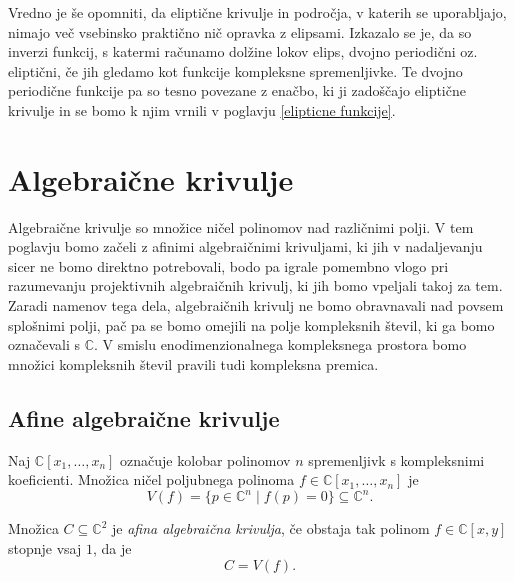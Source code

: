 \documentclass[mat1]{fmfdelo}
\numberwithin{equation}{section}
\newcommand{\C}{\mathbb C}
\theoremstyle{definition}
\begin{document}
Vredno je še opomniti, da eliptične krivulje in področja, v katerih se uporabljajo,
nimajo več vsebinsko praktično nič opravka z elipsami. 
Izkazalo se je, da so inverzi funkcij, s katermi računamo dolžine lokov elips, dvojno periodični oz. eliptični,
če jih gledamo kot funkcije kompleksne spremenljivke. Te dvojno periodične funkcije pa so tesno povezane z enačbo,
ki ji zadoščajo eliptične krivulje in se bomo k njim vrnili v poglavju \ref{elipticne funkcije}.


\section{Algebraične krivulje} \label{algebraicne krivulje}
Algebraične krivulje so množice ničel polinomov nad različnimi polji. V tem poglavju bomo začeli 
z afinimi
algebraičnimi krivuljami, ki jih v nadaljevanju sicer ne bomo direktno potrebovali, bodo pa igrale pomembno
vlogo pri razumevanju projektivnih algebraičnih krivulj, ki jih bomo vpeljali takoj za tem. 
Zaradi namenov tega dela, algebraičnih krivulj ne bomo obravnavali nad povsem splošnimi polji, pač pa se
bomo omejili na polje kompleksnih števil, ki ga bomo označevali s $\C$. V smislu enodimenzionalnega kompleksnega prostora bomo množici kompleksnih števil pravili tudi kompleksna premica.


\subsection{Afine algebraične krivulje} 
Naj $\C[x_1, \dots, x_n]$ označuje kolobar polinomov $n$ spremenljivk s
kompleksnimi koeficienti. Množica ničel poljubnega polinoma $f \in \C[x_1, \dots, x_n]$ je
\[
    V(f) = \{p \in \C^n \mid f(p) = 0 \} \subseteq \C^n.
\] 

\begin{definicija}
    Množica $C \subseteq \C^2$ je \emph{afina algebraična krivulja}, če obstaja tak polinom $f \in \C[x,y]$ stopnje vsaj $1$, da je
    \[
        C = V(f).
    \]
\end{definicija}
\end{document}
